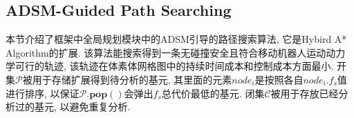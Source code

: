 \documentclass[preprint,5p,times,twocolumn]{elsarticle}
\begin{document}
\subsection{ADSM-Guided Path Searching}
\label{Path_Searching}

本节介绍了框架中全局规划模块中的ADSM引导的路径搜索算法, 它是Hybird A* Algorithm的扩展. 该算法能搜索得到一条无碰撞安全且符合移动机器人运动动力学可行的轨迹, 该轨迹在体素体网格图中的持续时间成本和控制成本方面最小. 
开集$\mathcal{P}$被用于存储扩展得到待分析的基元, 其里面的元素$node_i$是按照各自$node_i.f_s$值进行排序, 以保证$\mathcal{P}.\textbf{pop}()$会弹出$f_s$总代价最低的基元. 闭集$\mathcal{C}$被用于存放已经分析过的基元, 以避免重复分析. 
\end{document}
